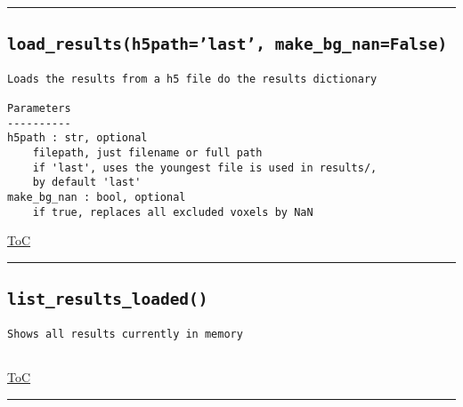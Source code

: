 \documentclass{article}
\begin{document}


\vspace{5mm}

\hrule

\subsection*{\texttt{load\_results(h5path='last', make\_bg\_nan=False)}}
\label{fun:loadresults}

\begin{lstlisting}[language=docstring]
Loads the results from a h5 file do the results dictionary

Parameters
----------
h5path : str, optional
    filepath, just filename or full path
    if 'last', uses the youngest file is used in results/, 
    by default 'last'
make_bg_nan : bool, optional
    if true, replaces all excluded voxels by NaN
\end{lstlisting}

\begin{flushright}

\hyperref[toc]{ToC}

\end{flushright}



\vspace{5mm}

\hrule

\subsection*{\texttt{list\_results\_loaded()}}
\label{fun:listresultsloaded}

\begin{lstlisting}[language=docstring]
Shows all results currently in memory
    
\end{lstlisting}

\begin{flushright}

\hyperref[toc]{ToC}

\end{flushright}



\vspace{5mm}

\hrule
\end{document}
